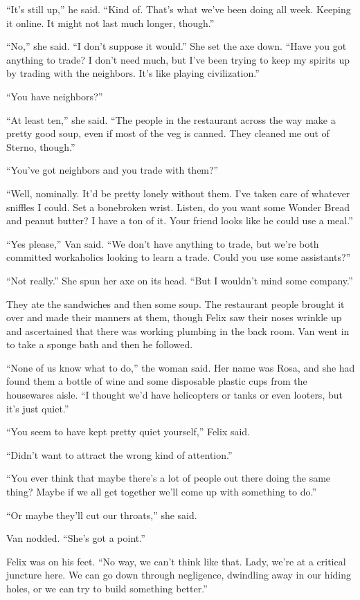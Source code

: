 “It’s still up,” he said. “Kind of. That’s what we’ve been doing
all week. Keeping it online. It might not last much longer,
though.”

“No,” she said. “I don’t suppose it would.” She set the axe down.
“Have you got anything to trade? I don’t need much, but I’ve been
trying to keep my spirits up by trading with the neighbors. It’s
like playing civilization.”

“You have neighbors?”

“At least ten,” she said. “The people in the restaurant across the
way make a pretty good soup, even if most of the veg is canned.
They cleaned me out of Sterno, though.”

“You’ve got neighbors and you trade with them?”

“Well, nominally. It’d be pretty lonely without them. I’ve taken
care of whatever sniffles I could. Set a bone\dash{}broken wrist. Listen,
do you want some Wonder Bread and peanut butter? I have a ton of
it. Your friend looks like he could use a meal.”

“Yes please,” Van said. “We don’t have anything to trade, but we’re
both committed workaholics looking to learn a trade. Could you use
some assistants?”

“Not really.” She spun her axe on its head. “But I wouldn’t mind
some company.”

They ate the sandwiches and then some soup. The restaurant people
brought it over and made their manners at them, though Felix saw
their noses wrinkle up and ascertained that there was working
plumbing in the back room. Van went in to take a sponge bath and
then he followed.

“None of us know what to do,” the woman said. Her name was Rosa,
and she had found them a bottle of wine and some disposable plastic
cups from the housewares aisle. “I thought we’d have helicopters or
tanks or even looters, but it’s just quiet.”

“You seem to have kept pretty quiet yourself,” Felix said.

“Didn’t want to attract the wrong kind of attention.”

“You ever think that maybe there’s a lot of people out there doing
the same thing? Maybe if we all get together we’ll come up with
something to do.”

“Or maybe they’ll cut our throats,” she said.

Van nodded. “She’s got a point.”

Felix was on his feet. “No way, we can’t think like that. Lady,
we’re at a critical juncture here. We can go down through
negligence, dwindling away in our hiding holes, or we can try to
build something better.”

